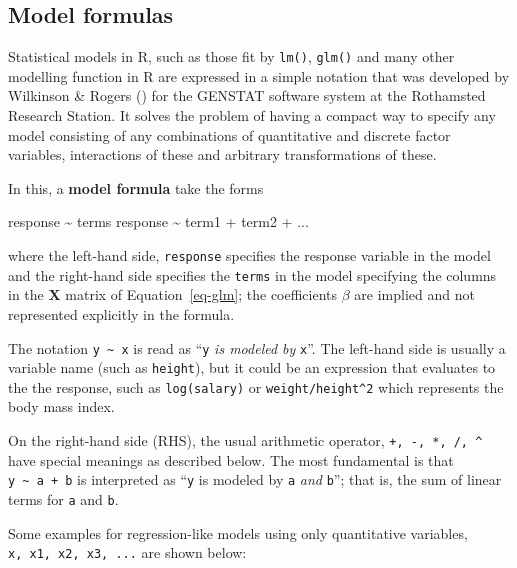 \documentclass[
  letterpaper,
  10pt,
  krantz2]{krantz}
\makeatletter
\newenvironment{Shaded}{\begin{snugshade}}{\end{snugshade}}
\newcommand{\NormalTok}[1]{\textcolor[rgb]{0.00,0.23,0.31}{#1}}
\newcommand{\SpecialCharTok}[1]{\textcolor[rgb]{0.37,0.37,0.37}{#1}}
\newenvironment{kframe}{%
  \medskip{}
  \setlength{\fboxsep}{.8em}
  \def\at@end@of@kframe{}%
  \ifinner\ifhmode%
  \def\at@end@of@kframe{\end{minipage}}%
  \begin{minipage}{\columnwidth}%
  \fi\fi%
  \def\FrameCommand##1{\hskip\@totalleftmargin \hskip-\fboxsep
  \colorbox{shadecolor}{##1}\hskip-\fboxsep
      \hskip-\linewidth \hskip-\@totalleftmargin \hskip\columnwidth}%
  \MakeFramed {\advance\hsize-\width
    \@totalleftmargin\z@ \linewidth\hsize
    \@setminipage}}%
{\par\unskip\endMakeFramed%
  \at@end@of@kframe}
\renewenvironment{Shaded}{\begin{kframe}}{\end{kframe}}
\makeatother
\begin{document}
\subsection{Model formulas}\label{sec-model-formulas}

Statistical models in R, such as those fit by \texttt{lm()},
\texttt{glm()} and many other modelling function in R are expressed in a
simple notation that was developed by Wilkinson \& Rogers
() for the GENSTAT software
system at the Rothamsted Research Station. It solves the problem of
having a compact way to specify any model consisting of any combinations
of quantitative and discrete factor variables, interactions of these and
arbitrary transformations of these.

In this, a \textbf{model formula} take the forms

\begin{Shaded}
\begin{Highlighting}[]
\NormalTok{response }\SpecialCharTok{\textasciitilde{}}\NormalTok{ terms}
\NormalTok{response }\SpecialCharTok{\textasciitilde{}}\NormalTok{ term1 }\SpecialCharTok{+}\NormalTok{ term2 }\SpecialCharTok{+}\NormalTok{ ...}
\end{Highlighting}
\end{Shaded}

where the left-hand side, \texttt{response} specifies the response
variable in the model and the right-hand side specifies the
\texttt{terms} in the model specifying the columns in the \(\mathbf{X}\)
matrix of Equation~\ref{eq-glm}; the coefficients \(\beta\) are implied
and not represented explicitly in the formula.

The notation \texttt{y\ \textasciitilde{}\ x} is read as ``\texttt{y}
\emph{is modeled by} \texttt{x}''. The left-hand side is usually a
variable name (such as \texttt{height}), but it could be an expression
that evaluates to the the response, such as \texttt{log(salary)} or
\texttt{weight/height\^{}2} which represents the body mass index.

On the right-hand side (RHS), the usual arithmetic operator,
\texttt{+,\ -,\ *,\ /,\ \^{}} have special meanings as described below.
The most fundamental is that \texttt{y\ \textasciitilde{}\ a\ +\ b} is
interpreted as ``\texttt{y} is modeled by \texttt{a} \emph{and}
\texttt{b}''; that is, the sum of linear terms for \texttt{a} and
\texttt{b}.

Some examples for regression-like models using only quantitative
variables, \texttt{x,\ x1,\ x2,\ x3,\ ...} are shown below:
\end{document}
